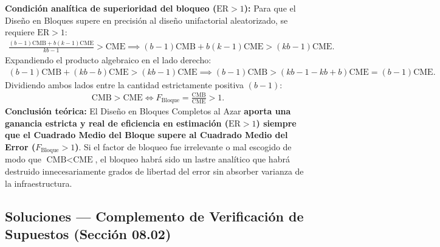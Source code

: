 \begin{solproblema}
\begin{enumerate}
		\textbf{Condición analítica de superioridad del bloqueo ($\text{ER} > 1$):}
		Para que el Diseño en Bloques supere en precisión al diseño unifactorial aleatorizado, se requiere $\text{ER} > 1$:
		\begin{align}
			\frac{(b-1)\text{CMB} + b(k-1)\text{CME}}{kb - 1} > \text{CME} \implies (b-1)\text{CMB} + b(k-1)\text{CME} > (kb - 1)\text{CME}.
		\end{align}
		Expandiendo el producto algebraico en el lado derecho:
		\begin{align}
			(b-1)\text{CMB} + (kb - b)\text{CME} > (kb - 1)\text{CME} \implies (b-1)\text{CMB} > (kb - 1 - kb + b)\text{CME} = (b-1)\text{CME}.
		\end{align}
		Dividiendo ambos lados entre la cantidad estrictamente positiva $(b-1)$:
		\begin{align}
			\text{CMB} > \text{CME} \iff F_{\text{Bloque}} = \frac{\text{CMB}}{\text{CME}} > 1.
		\end{align}
		\textbf{Conclusión teórica:} El Diseño en Bloques Completos al Azar \textbf{aporta una ganancia estricta y real de eficiencia en estimación ($\text{ER} > 1$) siempre que el Cuadrado Medio del Bloque supere al Cuadrado Medio del Error ($F_{\text{Bloque}} > 1$)}. Si el factor de bloqueo fue irrelevante o mal escogido de modo que $\text{CMB} < \text{CME}$, el bloqueo habrá sido un lastre analítico que habrá destruido innecesariamente grados de libertad del error sin absorber varianza de la infraestructura.
	\end{enumerate}
\end{solproblema}

\subsection{Soluciones --- Complemento de Verificación de Supuestos (Sección 08.02)}

